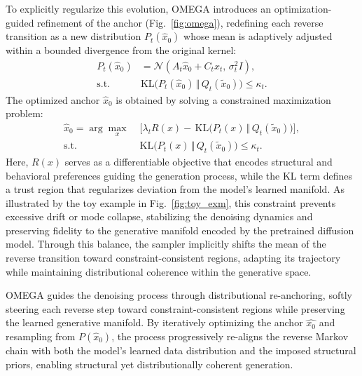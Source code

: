 \documentclass[10pt,twocolumn,letterpaper]{article}
\theoremstyle{plain}
\theoremstyle{remark}
\begin{document}
To explicitly regularize this evolution, OMEGA introduces an optimization-guided refinement of the anchor (Fig.~\ref{fig:omega}), redefining each reverse transition as a new distribution $P_t(\hat{x}_0)$ whose mean is adaptively adjusted within a bounded divergence from the original kernel:
\begin{equation}
\begin{aligned}
P_t(\hat{x}_0) &= \mathcal{N}(A_t \hat{x}_0 + C_t x_t,\, \sigma_t^2 I), \\
\text{s.t.} \quad 
&\mathrm{KL}\!\big(P_t(\hat{x}_0) \,\Vert\, Q_t(\tilde{x}_0)\big) \le \kappa_t.
\end{aligned}
\end{equation}
The optimized anchor $\hat{x}_0$ is obtained by solving a constrained maximization problem:
\begin{equation}
\begin{aligned}
\hat{x}_0
= \arg\max_{x}\;
&\Big[
\lambda_t R(x)
- \, \mathrm{KL}\!\big(P_t(x) \,\Vert\, Q_t(\tilde{x}_0)\big)
\Big], \\
\text{s.t.}\quad
&\mathrm{KL}\!\big(P_t(x) \,\Vert\, Q_t(\tilde{x}_0)\big)
\le \kappa_t.
\end{aligned}
\label{eq:omega_opt}
\end{equation}
Here, \(R(x)\) serves as a differentiable objective that encodes structural and behavioral preferences guiding the generation process, while the KL term defines a trust region that regularizes deviation from the model’s learned manifold.
As illustrated by the toy example in Fig.~\ref{fig:toy_exm}, this constraint prevents excessive drift or mode collapse, stabilizing the denoising dynamics and preserving fidelity to the generative manifold encoded by the pretrained diffusion model.
Through this balance, the sampler implicitly shifts the mean of the reverse transition toward constraint-consistent regions, adapting its trajectory while maintaining distributional coherence within the generative space.

OMEGA guides the denoising process through distributional re-anchoring, softly steering each reverse step toward constraint-consistent regions while preserving the learned generative manifold. By iteratively optimizing the anchor $\hat{x_0}$ and resampling from $P\left(\hat{x}_0\right)$, the process progressively re-aligns the reverse Markov chain with both the model’s learned data distribution and the imposed structural priors, enabling structural yet distributionally coherent generation.
\end{document}

